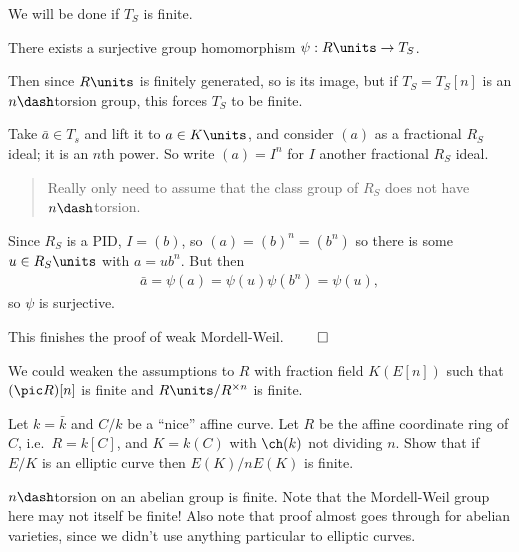 We will be done if \(T_S\) is finite.

\begin{description}
\tightlist
\item[Claim]
There exists a surjective group homomorphism \(\psi: R\units \to T_S\).
\end{description}

Then since \(R\units\) is finitely generated, so is its image, but if
\(T_S = T_S[n]\) is an \(n\dash\)torsion group, this forces \(T_S\) to
be finite.

\begin{center}\end{center}

Take \(\bar a \in T_s\) and lift it to \(a\in K\units\), and consider
\((a)\) as a fractional \(R_S\) ideal; it is an \(n\)th power. So write
\((a) = I^n\) for \(I\) another fractional \(R_S\) ideal.

\begin{quote}
Really only need to assume that the class group of \(R_S\) does not have
\(n\dash\)torsion.
\end{quote}

Since \(R_S\) is a PID, \(I = (b)\), so \((a) = (b)^n = (b^n)\) so there
is some \(u\in R_S\units\) with \(a = ub^n\). But then
\begin{align*}
\bar a = \psi(a) = \psi(u) \psi(b^n)
 = \psi(u)
 ,\end{align*} so \(\psi\) is surjective.

This finishes the proof of weak Mordell-Weil. \(\qed\)

\begin{description}
\tightlist
\item[Remark]
We could weaken the assumptions to \(R\) with fraction field \(K(E[n])\)
such that \((\pic R)[n]\) is finite and \(R\units / R^{\times n}\) is
finite.
\item[Exercise]
Let \(k = \bar k\) and \(C/k\) be a ``nice'' affine curve. Let \(R\) be
the affine coordinate ring of \(C\), i.e.~\(R = k[C]\), and \(K = k(C)\)
with \(\ch(k)\) not dividing \(n\). Show that if \(E/K\) is an elliptic
curve then \(E(K) / n E(K)\) is finite.
\end{description}

\(n\dash\)torsion on an abelian group is finite. Note that the
Mordell-Weil group here may not itself be finite! Also note that proof
almost goes through for abelian varieties, since we didn't use anything
particular to elliptic curves.

